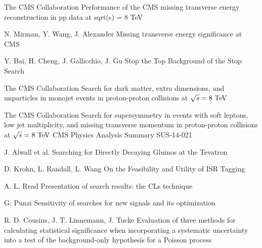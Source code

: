 \begin{thebibliography}{2}
             {The CMS Collaboration}
             {Performance of the CMS missing transverse energy reconstruction in pp data at sqrt(s) = 8 TeV}
             {}


             {N. Mirman, Y. Wang, J. Alexander}
             {Missing transverse energy significance at CMS}
             {}

             {Y. Bai, H. Cheng, J. Gallicchio, J. Gu}
             {Stop the Top Background of the Stop Search}
             {}


             {The CMS Collaboration}
             {Search for dark matter, extra dimensions, and unparticles in monojet events in proton-proton collisions at $\sqrt{s} = 8~\text{TeV}$}
             {}

             {The CMS Collaboration}
             {Search for supersymmetry in events with soft leptons, low
             jet multiplicity, and missing transverse momentum in
             proton-proton collisions at $\sqrt{s} = 8~\text{TeV}$}
             {CMS Physics Analysis Summary SUS-14-021}

             {J. Alwall et al.}
             {Searching for Directly Decaying Gluinos at the Tevatron}
             {}

             {D. Krohn, L. Randall, L. Wang}
             {On the Feasibility and Utility of ISR Tagging}
             {}


             {A. L. Read}
             {Presentation of search results: the CLs technique}
             {}

             {G. Punzi}
             {Sensitivity of searches for new signals and its optimization}
             {}

             {R. D. Cousins, J. T. Linnemann, J. Tucke}
             {Evaluation of three methods for calculating
             statistical significance when incorporating a
             systematic uncertainty into a test of the
             background-only hypothesis for a Poisson
             process}
             {}


\end{thebibliography}

